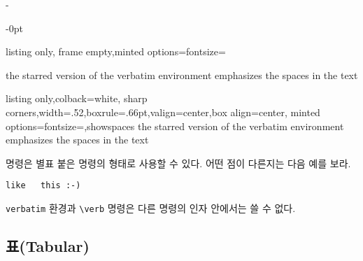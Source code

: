 \checkoddpage
\ifoddpage
\noindent\begin{adjustwidth}{0pt}{-\margheadwidth}
\else
\noindent\begin{adjustwidth}{-\margheadwidth}{0pt}
\fi 
\noindent\hspace*{-1.5em}\begin{minipage}[c]{.49\linewidth}%
    \noindent
\begin{tcblisting}{listing only, frame empty,minted options={fontsize=\small\ttfamily}}
\begin{verbatim*}
the starred version of
the      verbatim
environment emphasizes
the spaces   in the text
\end{verbatim*}
\end{tcblisting}
  \end{minipage}\fboxsep=8pt\hspace{.3em}%
\begin{tcblisting}{listing only,colback=white,%
    sharp corners,width=.52\linewidth,boxrule=.66pt,valign=center,box align=center,
    minted options={fontsize=\normalsize\ttfamily,showspaces}}
the starred version of
the      verbatim
environment emphasizes
the spaces   in the text
\end{tcblisting}
\end{adjustwidth}


\medskip

 명령은 별표 붙은 명령의 형태로 사용할 수 있다. 어떤 점이 다른지는 다음 예를 보라.

\begin{example}
\verb*|like   this :-) |
\end{example}

\texttt{verbatim} 환경과 \verb|\verb| 명령은 다른 명령의 인자 안에서는 쓸 수 없다.

\subsection{표(Tabular)}


\end{adjustwidth}
